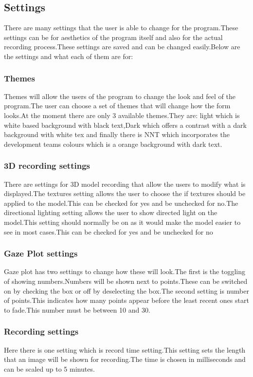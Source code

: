 \subsection{Settings}
There are many settings that the user is able to change for the program.These settings can be for aesthetics of the program itself and also for the actual recording process.These settings are saved and can be changed easily.Below are the settings and what each of them are for:
\subsubsection{Themes}
Themes will allow the users of the program to change the look and feel of the program.The user can choose a set of themes that will change how the form looks.At the moment there are only 3 available themes.They are: light which is white based background with black  text,Dark which offers a contrast with a dark background with white tex and finally there is NNT which incorporates the development teams colours which is a orange background with dark text. 
\subsubsection{3D recording settings}
There are settings for 3D model recording that allow the users to modify what is displayed.The textures setting allows the user to choose the if textures should be applied to the model.This can be checked for yes and be unchecked for no.The directional lighting setting allows the user to show directed light on the model.This setting should normally be on as it would make the model easier to see in most cases.This can be checked for yes and be unchecked for no
\subsubsection{Gaze Plot settings}
Gaze plot has two settings to change how these will look.The first is the toggling of showing numbers.Numbers will be shown next to points.These can be switched on by checking the box or off by deselecting the box.The second setting is number of points.This indicates how many points appear before the least recent ones start to fade.This number must be between 10 and 30.
\subsubsection{Recording settings}
Here there is one setting which is record time setting.This setting sets the length that an image will be shown for recording.The time is chosen in milliseconds and can be scaled up to 5 minutes.
\fi